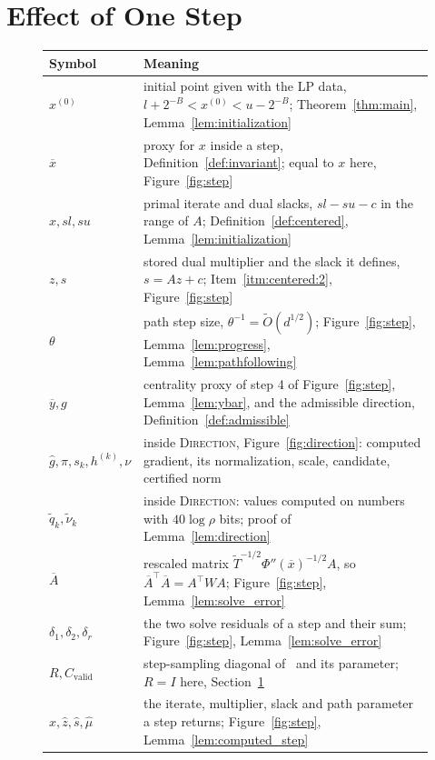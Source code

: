 \documentclass[11pt]{article}
\renewcommand{\O}{\widetilde O}
\newcommand{\xini}{x^{(0)}}
\newcommand{\xhat}{\widehat{x}}
\newcommand{\shat}{\widehat{s}}
\newcommand{\zhat}{\widehat{z}}
\newcommand{\muhat}{\widehat{\mu}}
\newcommand{\ghat}{\widehat{g}}
\newcommand{\Cvalid}{C_{\mathrm{valid}}}
\begin{document}
\section{Effect of One Step}
\label{sec:potential_and_progress}

\begin{figure}[H]
\begin{center}\small
\begin{tabular}{@{}lp{}@{}}
\toprule
Symbol & Meaning \\
\midrule
$\xini$ & initial point given with the LP data, $l+2^{-B}<\xini<u-2^{-B}$; Theorem~\ref{thm:main}, Lemma~\ref{lem:initialization} \\
$\overline x$ & proxy for $x$ inside a step, Definition~\ref{def:invariant}; equal to $x$ here, Figure~\ref{fig:step} \\
$x,sl,su$ & primal iterate and dual slacks, $sl - su - c$ in the range of $A$; Definition~\ref{def:centered}, Lemma~\ref{lem:initialization} \\
$z,s$ & stored dual multiplier and the slack it defines, $s = Az + c$; Item~\ref{itm:centered:2}, Figure~\ref{fig:step} \\
$\theta$ & path step size, $\theta^{-1} = \O(d^{1/2})$; Figure~\ref{fig:step}, Lemma~\ref{lem:progress}, Lemma~\ref{lem:pathfollowing} \\
$\overline y, g$ & centrality proxy of step 4 of Figure~\ref{fig:step}, Lemma~\ref{lem:ybar}, and the admissible direction, Definition~\ref{def:admissible} \\
$\ghat, \pi, s_k, h^{(k)}, \nu$ & inside \textsc{Direction}, Figure~\ref{fig:direction}: computed gradient, its normalization, scale, candidate, certified norm \\
$\widetilde{q}_k, \widetilde{\nu}_k$ & inside \textsc{Direction}: values computed on numbers with $40 \log \rho$ bits; proof of Lemma~\ref{lem:direction} \\
$\overline A$ & rescaled matrix $\widetilde T^{-1/2}\Phi''(\overline x)^{-1/2}A$, so $\overline A^\top\overline A = A^\top WA$; Figure~\ref{fig:step}, Lemma~\ref{lem:solve_error} \\
$\delta_1,\delta_2,\delta_r$ & the two solve residuals of a step and their sum; Figure~\ref{fig:step}, Lemma~\ref{lem:solve_error} \\
$R,\Cvalid$ & step-sampling diagonal of~\cite{BLLSSSW21} and its parameter; $R = I$ here, Section~\ref{sec:potential_and_progress} \\
$\xhat,\zhat,\shat,\muhat$ & the iterate, multiplier, slack and path parameter a step returns; Figure~\ref{fig:step}, Lemma~\ref{lem:computed_step} \\

\end{tabular}
\end{center}
\end{figure}
\end{document}
